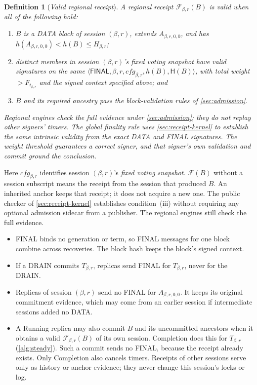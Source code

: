 \documentclass[11pt,a4paper]{article}
\newcommand{\FC}{\mathcal F}
\newcommand{\Hash}{\mathsf H}
\newcommand{\tagg}[1]{\ensuremath{\mathsf{#1}}}
\newcommand{\defterm}[1]{\textcolor{rrBlue}{\textit{#1}}}
\newtheorem{definition}{Definition}[section]
\begin{document}
\begin{definition}[\defterm{Valid regional receipt}]
\label{def:receipt}
A regional receipt $\FC_{\beta,r}(B)$ is valid when all of the following hold:
\begin{enumerate}[label=(\roman*)]
\item $B$ is a DATA block of session $(\beta,r)$, extends
$A_{\beta,r,0,0}$, and has $h(A_{\beta,r,0,0})<h(B)\le H_{\beta,r}$;
\item distinct members in session $(\beta,r)$'s fixed voting snapshot have
valid signatures on the same
$\langle\tagg{FINAL},\beta,r,\mathit{cfg}_{\beta,r},h(B),\Hash(B)\rangle$,
with total weight $>F_{i_{\beta,r}}$ and the signed context specified above; and
\item $B$ and its required ancestry pass the block-validation rules of
\cref{sec:admission}.
\end{enumerate}
Regional engines check the full evidence under \cref{sec:admission};
they do not replay other signers' timers. The global finality rule uses
\cref{sec:receipt-kernel} to establish the same intrinsic validity from
the exact DATA and FINAL signatures. The weight threshold guarantees a
correct signer, and that signer's own validation and commit ground the
conclusion.
\end{definition}
Here $\mathit{cfg}_{\beta,r}$ identifies session $(\beta,r)$'s \defterm{fixed
voting snapshot}. $\FC(B)$ without a session subscript means the receipt
from the session that produced $B$. An inherited anchor keeps that
receipt; it does not acquire a new one. The public checker of
\cref{sec:receipt-kernel} establishes condition~(iii) without requiring
any optional admission sidecar from a publisher. The regional engines
still check the full evidence.
\begin{itemize}
\item FINAL binds no generation or term, so FINAL messages for one block
combine across recoveries. The block hash keeps the block's signed
context.
\item If a DRAIN commits $T_{\beta,r}$, replicas send FINAL for
$T_{\beta,r}$, never for the DRAIN.
\item Replicas of session $(\beta,r)$ send no FINAL for $A_{\beta,r,0,0}$.
It keeps its original commitment evidence, which may come from an earlier
session if intermediate sessions added no DATA.
\item A Running replica may also commit $B$ and its uncommitted ancestors when it
obtains a valid $\FC_{\beta,r}(B)$ of its own session. Completion does
this for $T_{\beta,r}$ (\cref{alg:steady}). Such a commit sends no FINAL,
because the receipt already exists. Only Completion also cancels timers.
Receipts of other sessions serve only as history or anchor evidence;
they never change this session's locks or log.
\end{itemize}
\end{document}
